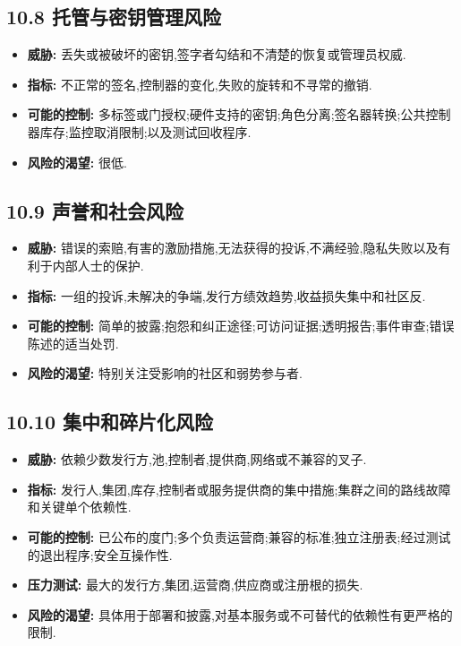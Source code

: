 \documentclass[11pt]{article}
\begin{document}
\subsection*{10.8 托管与密钥管理风险}

\begin{itemize}[leftmargin=*]
\item \textbf{威胁:} 丢失或被破坏的密钥,签字者勾结和不清楚的恢复或管理员权威.
\item \textbf{指标:} 不正常的签名,控制器的变化,失败的旋转和不寻常的撤销.
\item \textbf{可能的控制:} 多标签或门授权;硬件支持的密钥;角色分离;签名器转换;公共控制器库存;监控取消限制;以及测试回收程序.
\item \textbf{风险的渴望:} 很低.
\end{itemize}
\subsection*{10.9 声誉和社会风险}

\begin{itemize}[leftmargin=*]
\item \textbf{威胁:} 错误的索赔,有害的激励措施,无法获得的投诉,不满经验,隐私失败以及有利于内部人士的保护.
\item \textbf{指标:} 一组的投诉,未解决的争端,发行方绩效趋势,收益损失集中和社区反.
\item \textbf{可能的控制:} 简单的披露;抱怨和纠正途径;可访问证据;透明报告;事件审查;错误陈述的适当处罚.
\item \textbf{风险的渴望:} 特别关注受影响的社区和弱势参与者.
\end{itemize}
\subsection*{10.10 集中和碎片化风险}

\begin{itemize}[leftmargin=*]
\item \textbf{威胁:} 依赖少数发行方,池,控制者,提供商,网络或不兼容的叉子.
\item \textbf{指标:} 发行人,集团,库存,控制者或服务提供商的集中措施;集群之间的路线故障和关键单个依赖性.
\item \textbf{可能的控制:} 已公布的度门;多个负责运营商;兼容的标准;独立注册表;经过测试的退出程序;安全互操作性.
\item \textbf{压力测试:} 最大的发行方,集团,运营商,供应商或注册根的损失.
\item \textbf{风险的渴望:} 具体用于部署和披露,对基本服务或不可替代的依赖性有更严格的限制.
\end{itemize}
\end{document}
